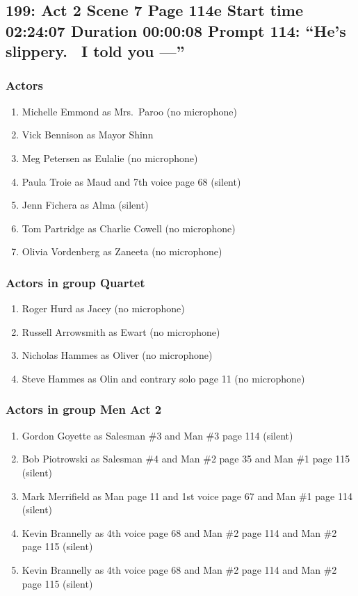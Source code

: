 \subsection{199: Act 2 Scene 7 Page 114e Start time 02:24:07 Duration 00:00:08 Prompt 114: ``He's slippery.~ I told you ---''}

\subsubsection{Actors}
\begin{enumerate}
\item Michelle Emmond as Mrs.~Paroo (no microphone)
\item Vick Bennison as Mayor Shinn
\item Meg Petersen as Eulalie (no microphone)
\item Paula Troie as Maud and 7th voice page 68 (silent)
\item Jenn Fichera as Alma (silent)
\item Tom Partridge as Charlie Cowell (no microphone)
\item Olivia Vordenberg as Zaneeta (no microphone)
\end{enumerate}
\subsubsection{Actors in group Quartet}
\begin{enumerate}
\item Roger Hurd as Jacey (no microphone)
\item Russell Arrowsmith as Ewart (no microphone)
\item Nicholas Hammes as Oliver (no microphone)
\item Steve Hammes as Olin and contrary solo page 11 (no microphone)
\end{enumerate}
\subsubsection{Actors in group Men Act 2}
\begin{enumerate}
\item Gordon Goyette as Salesman \#3 and Man \#3 page 114 (silent)
\item Bob Piotrowski as Salesman \#4 and Man \#2 page 35 and Man \#1 page 115 (silent)
\item Mark Merrifield as Man page 11 and 1st voice page 67 and Man \#1 page 114 (silent)
\item Kevin Brannelly as 4th voice page 68 and Man \#2 page 114 and Man \#2 page 115 (silent)
\item Kevin Brannelly as 4th voice page 68 and Man \#2 page 114 and Man \#2 page 115 (silent)
\end{enumerate}
